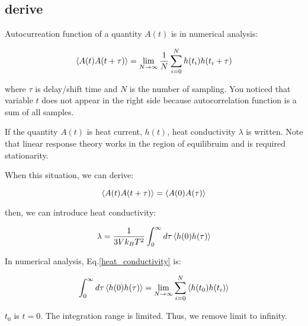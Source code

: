 \subsection{derive}

Autocurreation function of a quantity \(A(t)\) is in numerical analysis:

\begin{equation}
  \left< A(t) A(t + \tau) \right> = \lim_{N \rightarrow \infty}\frac{1}{N} \sum_{i = 0}^{N} h(t_i)h(t_i + \tau)
  \label{acf}
\end{equation}

where \(\tau \) is delay/shift time and \(N\) is the number of sampling.
You noticed that variable \(t\) does not appear in the right side because autocorrelation function is a sum of all samples.

If the quantity \(A(t)\) is heat current, \(h(t)\), heat conductivity \(\lambda \) is written. Note that linear response theory works in the region of equilibruim and is required stationarity.

When this situation, we can derive:

\begin{equation}
  \left< A(t) A(t + \tau) \right>  = \left< A(0) A(\tau) \right>
\end{equation}

then, we can introduce heat conductivity:

\begin{equation}
  \lambda = \frac{1}{3Vk_B T^2} \int_0^\infty d\tau \left< h(0) h(\tau) \right>
  \label{heat_conductivity}
\end{equation}

In numerical analysis, Eq.\ref{heat_conductivity} is:

\begin{equation}
  \int_0^\infty d\tau \left< h(0) h(\tau) \right> = \lim_{N \rightarrow \infty} \sum_{i=0}^N \left< h(t_0) h(t_i) \right>
  \label{numerical_heat_conductivity}
\end{equation}

\(t_0\) is \(t = 0\). The integration range is limited. Thus, we remove limit to infinity.
